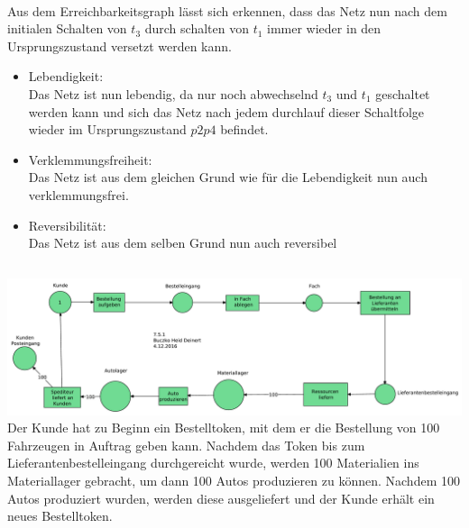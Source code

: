 \documentclass[a4paper,12pt]{scrartcl}
\begin{document}
\\
Aus dem Erreichbarkeitsgraph lässt sich erkennen, dass
das Netz nun nach dem initialen Schalten von $t_3$ durch 
schalten von $t_1$ immer wieder in den Ursprungszustand 
versetzt werden kann.
\begin{itemize}
  \item{Lebendigkeit:}\\
    Das Netz ist nun lebendig, da nur noch abwechselnd $t_3$ und $t_1$ geschaltet werden kann und sich das Netz nach jedem durchlauf dieser Schaltfolge wieder im Ursprungszustand $p2p4$ befindet.  
  \item{Verklemmungsfreiheit:}\\
    Das Netz ist aus dem gleichen Grund wie für die 
    Lebendigkeit nun auch verklemmungsfrei.
  \item{Reversibilität:}\\
    Das Netz ist aus dem selben Grund nun auch 
    reversibel

\end{itemize}
\subsection{}
\subsection{}
\subsubsection{}
\includegraphics[scale=0.4]{G-6-A-07-Netz2-Buczko_Heid_Deinert.pdf}\\
Der Kunde hat zu Beginn ein Bestelltoken, mit dem er 
die Bestellung von 100 Fahrzeugen in Auftrag geben 
kann. Nachdem das Token bis zum Lieferantenbestelleingang durchgereicht wurde,
werden 100 Materialien ins Materiallager gebracht,
um dann 100 Autos produzieren zu können.
Nachdem 100 Autos produziert wurden, werden diese ausgeliefert
und der Kunde erhält ein neues Bestelltoken.

\end{document}
